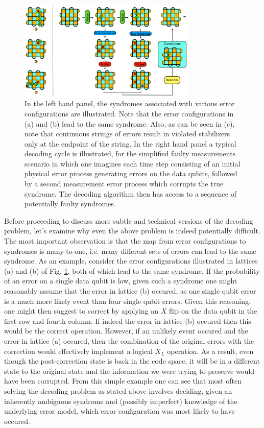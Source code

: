 \documentclass[onecolumn,preprintnumbers,amsmath,amssymb,notitlepage,nofootinbib,longbibliography,superscriptaddress,aps,pra,10pt]{revtex4-1}
\begin{document}
    \begin{figure}
      \centering
          \includegraphics[width=0.75\textwidth]{decoding_problem.pdf}
      \caption{In the left hand panel, the syndromes associated with various error configurations are illustrated. Note that the error configurations in (a) and (b) lead to the same syndrome. Also, as can be seen in (c), note that continuous strings of errors result in violated stabilizers only at the endpoint of the string. In the right hand panel a typical decoding cycle is illustrated, for the simplified faulty measurements scenario in which one imagines each time step consisting of an initial physical error process generating errors on the data qubits, followed by a second measurement error process which corrupts the true syndrome. The decoding algorithm then has access to a sequence of potentially faulty syndromes.}\label{f:decoding_problem}
    \end{figure}

    \noindent Before proceeding to discuss more subtle and technical versions of the decoding problem, let's examine why even the above problem is indeed potentially difficult. The most important observation is that the map from error configurations to syndromes is many-to-one, i.e. many different sets of errors can lead to the same syndrome. As an example, consider the error configurations illustrated in lattices (a) and (b) of Fig. \ref{f:decoding_problem}, both of which lead to the same syndrome. If the probability of an error on a single data qubit is low, given such a syndrome one might reasonably assume that the error in lattice (b) occured, as one single qubit error is a much more likely event than four single qubit errors. Given this reasoning, one might then suggest to correct by applying an $X$ flip on the data qubit in the first row and fourth column. If indeed the error in lattice (b) occured then this would be the correct operation. However, if an unlikely event occured and the error in lattice (a) occured, then the combination of the original errors with the correction would effectively implement a logical $X_L$ operation. As a result, even though the post-correction state is back in the code space, it will be in a different state to the original state and the information we were trying to preserve would have been corrupted. From this simple example one can see that most often solving the decoding problem as stated above involves deciding, given an inherently ambiguous syndrome and (possibly imperfect) knowledge of the underlying error model, which error configuration was most likely to have occured. 
\end{document}
